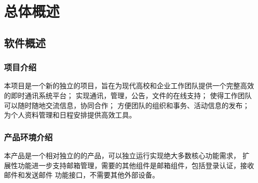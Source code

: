 \chapter{\color{red} 总体概述}
\section{软件概述}

	\subsection{项目介绍}
	本项目是一个新的独立的项目，旨在为现代高校和企业工作团队提供一个完整高效的即时通讯系统平台；
	实现通讯，管理，公告，文件的在线支持；
	使得工作团队可以随时随地交流信息，协同合作；
	方便团队的组织和事务、活动信息的发布；
	为个人资料管理和日程安排提供高效工具。

	\subsection{产品环境介绍}
	本产品是一个相对独立的的产品，可以独立运行实现绝大多数核心功能需求，
	扩展性功能进一步支持邮箱管理，需要的其他组件是邮箱组件，包括登录认证，接收邮件和发送邮件
	功能接口，不需要其他外部设备。
\newpage
